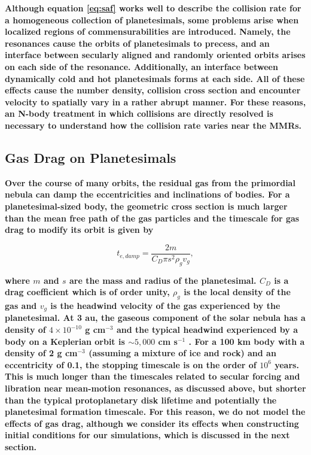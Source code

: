 \documentclass[fleqn,usenatbib]{mnras}
\begin{document}
\textbf{Although equation \ref{eq:saf} works well to describe the collision rate for a homogeneous collection of planetesimals, some problems arise when localized regions of commensurabilities are introduced. Namely, the resonances cause the orbits of planetesimals to precess, and an interface between secularly aligned and randomly oriented orbits arises on each side of the resonance. Additionally, an interface between dynamically cold and hot planetesimals forms at each side. All of these effects cause the number density, collision cross section and encounter velocity to spatially vary in a rather abrupt manner. For these reasons, an N-body treatment in which collisions are directly resolved is necessary to understand how the collision rate varies near the MMRs.}

\subsection{Gas Drag on Planetesimals}\label{sec:pl_drag}

\textbf{Over the course of many orbits, the residual gas from the primordial nebula can damp the eccentricities and inclinations of bodies. For a planetesimal-sized body, the geometric cross section is much larger than the mean free path of the gas particles and the timescale for gas drag to modify its orbit is given by \citep{1976PThPh..56.1756A}}

\begin{equation}\label{eq:t_edamp}
    t_{e, damp} = \frac{2 m}{C_{D} \pi s^{2} \rho_{g} v_{g}},
\end{equation}

\noindent \textbf{where $m$ and $s$ are the mass and radius of the planetesimal. $C_{D}$ is a drag coefficient which is of order unity, $
\rho_{g}$ is the local density of the gas and $v_{g}$ is the headwind velocity of the gas experienced by the planetesimal. At 3 au, the gaseous component of the solar nebula has a density of $4 
\times 10^{-10}$ g cm$^{-3}$ and the typical headwind experienced by a body on a Keplerian orbit is $\sim 5,000$ cm s$^{-1}$ \citep{1981PThPS..70...35H}. For a 100 km body with a 
density of 2 g cm$^{-3}$ \textbf{(assuming a mixture of ice and rock)} and an eccentricity of 0.1, the stopping timescale is on the order of $10^{6}$ years. This is much longer than the timescales related to secular forcing and libration near mean-motion resonances, as discussed above, but shorter than the typical protoplanetary disk lifetime and potentially the planetesimal formation timescale. For this reason, we do not model the effects of gas drag, although we consider its effects when constructing initial conditions for our simulations, which is discussed in the next section.}
\end{document}

